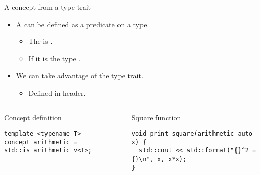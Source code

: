 \begin{frame}[t,fragile]{A concept from a type trait}
\begin{itemize}
  \item A  can be defined as a predicate on a type.
    \begin{itemize}
      \item The  is .
      \item If it is  the type .
    \end{itemize}

  \item We can take advantage of the  type trait.
    \begin{itemize}
      \item Defined in  header.
    \end{itemize}
\end{itemize}

\begin{columns}[T]

\begin{block}{Concept definition}
\begin{lstlisting}
template <typename T>
concept arithmetic = std::is_arithmetic_v<T>;
\end{lstlisting}
\end{block}

\pause
{}
\begin{block}{Square function}
\begin{lstlisting}
void print_square(arithmetic auto x) {
  std::cout << std::format("{}^2 = {}\n", x, x*x);
}
\end{lstlisting}
\end{block}

\end{columns}
\end{frame}
